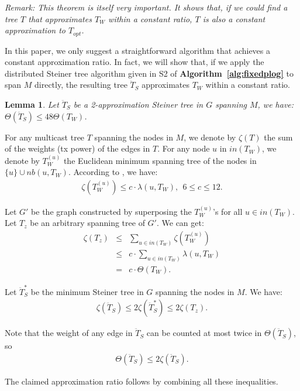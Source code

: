 \documentclass[10pt, conference, compsocconf]{IEEEtran}
\newtheorem{lemma}{\textbf{Lemma}}
\begin{document}
  \vspace{1ex}\noindent\textit{Remark: This theorem is itself very important. It shows that, if we could find a tree $T$ that approximates $T_W$ within a constant ratio, $T$ is also a constant approximation to $T_{opt}$.}\vspace{1ex}

  In this paper, we only suggest a straightforward algorithm that achieves a constant approximation ratio. In fact, we will show that, if we apply the distributed Steiner tree algorithm given in S2 of \textbf{Algorithm~\ref{alg:fixedplog}} to span $M$ directly, the resulting tree $\ddot{T}_S$ approximates $T_W$ within a constant ratio.
\begin{lemma}
Let $\ddot{T}_S$ be a 2-approximation Steiner tree in $G$ spanning $M$, we have: $\Theta (\ddot{T}_S) \le 48\Theta (T_W)$.
    \label{lma:steiner}
\end{lemma}
\begin{IEEEproof}
For any multicast tree $T$ spanning the nodes in $M$, we denote by $\zeta(T)$ the sum of the weights (tx power) of the edges in $T$. For any node $u$ in $\mathit{in}(T_W)$, we denote by $T_W^{(u)}$ the Euclidean minimum spanning tree of the nodes in $\{u\} \cup \mathit{nb}(u,{T_W})$. According to \cite{Wan2004}, we have:
\begin{eqnarray}
      \zeta\left(T_W^{(u)}\right) \le c \cdot \lambda (u,{T_W}),~~6\le c\le 12.
    \end{eqnarray}

    Let $G'$ be the graph constructed by superposing the $T_W^{(u)}$'s for all $u\in \mathit{in}(T_W)$. Let $T_z$ be an arbitrary spanning tree of $G'$. We can get:
\begin{eqnarray}
      \zeta ({T_z}) &\le& \sum\nolimits_{u \in \mathit{in}({T_W})} {\zeta \left(T_W^{(u)}\right)} \nonumber \\
      &\le& c \cdot \sum\nolimits_{u \in \mathit{in}({T_W})} {\lambda (u,{T_W})} \nonumber \\
      &=& c \cdot \Theta ({T_W}).
    \end{eqnarray}

    Let $\ddot{T}_S^*$ be the minimum Steiner tree in $G$ spanning the nodes in $M$. We have:
\begin{eqnarray}
      \zeta ({\ddot{T}_S}) \le 2\zeta (\ddot{T}_S^*) \le 2\zeta ({T_z}).
    \end{eqnarray}

    Note that the weight of any edge in $\ddot{T}_S$ can be counted at most twice in $\Theta ({\ddot{T}_S})$, so
\begin{eqnarray}
      \Theta ({\ddot{T}_S}) \le 2\zeta ({\ddot{T}_S}).
    \end{eqnarray}

    The claimed approximation ratio follows by combining all these inequalities.
\end{IEEEproof}
\end{document}
